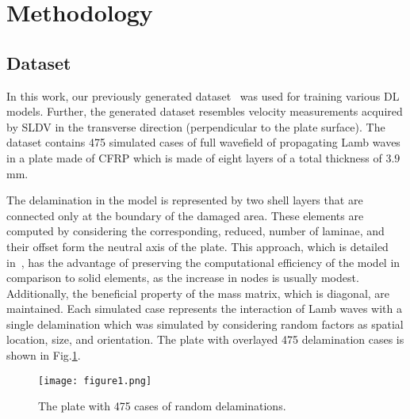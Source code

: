 \section{Methodology}
\label{methodology}
\subsection{Dataset}
In this work, our previously generated dataset~\cite{Ijjeh2021} was used for training various DL models.
Further, the generated dataset resembles velocity measurements acquired by SLDV in the transverse direction (perpendicular to the plate surface).
The dataset contains 475 simulated cases of full wavefield of propagating Lamb waves in a plate made of CFRP which is made of eight layers of a total thickness of \(3.9\) mm.

The delamination in the model is represented by two shell layers that are connected only at the boundary of the damaged area. 
These elements are computed by considering the corresponding, reduced, number of laminae, and their offset form the neutral axis of the plate. 
This approach, which is detailed in~\cite{Kudela2009}, has the advantage of preserving the computational efficiency of the model in comparison to solid elements, as the increase in nodes is usually modest. 
Additionally, the beneficial property of the mass matrix, which is diagonal, are maintained. 
Each simulated case represents the interaction of Lamb waves with a single   delamination which was simulated by considering random factors as spatial location, size, and orientation.
The plate with overlayed 475 delamination cases is shown in Fig.\ref{fig:rand_delaminations}. 
\begin{figure} [h!]
	\begin{center}
		\texttt{[image: figure1.png]}
	\end{center}
	\caption{The plate with 475 cases of random delaminations.} 
	\label{fig:rand_delaminations}
\end{figure}

